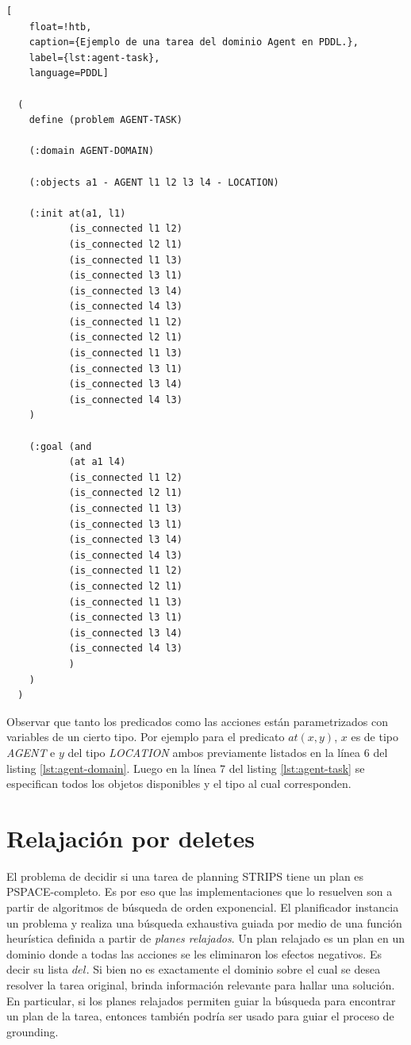 \begin{lstlisting}[
    float=!htb,
    caption={Ejemplo de una tarea del dominio Agent en PDDL.},
    label={lst:agent-task},
    language=PDDL]

  (
    define (problem AGENT-TASK)

    (:domain AGENT-DOMAIN)

    (:objects a1 - AGENT l1 l2 l3 l4 - LOCATION)

    (:init at(a1, l1)
           (is_connected l1 l2)
           (is_connected l2 l1)
           (is_connected l1 l3)
           (is_connected l3 l1)
           (is_connected l3 l4)
           (is_connected l4 l3)
           (is_connected l1 l2)
           (is_connected l2 l1)
           (is_connected l1 l3)
           (is_connected l3 l1)
           (is_connected l3 l4)
           (is_connected l4 l3)
    )
    
    (:goal (and 
           (at a1 l4)
           (is_connected l1 l2)
           (is_connected l2 l1)
           (is_connected l1 l3)
           (is_connected l3 l1)
           (is_connected l3 l4)
           (is_connected l4 l3)
           (is_connected l1 l2)
           (is_connected l2 l1)
           (is_connected l1 l3)
           (is_connected l3 l1)
           (is_connected l3 l4)
           (is_connected l4 l3)
           )
    )
  )
\end{lstlisting}

Observar que tanto los predicados como las acciones están parametrizados con
variables de un cierto tipo. Por ejemplo para el predicato $at(x, y)$, $x$ es de
tipo \emph{AGENT} e $y$ del tipo \emph{LOCATION} ambos previamente listados en
la línea 6 del listing \ref{lst:agent-domain}. Luego en la línea 7 del listing
\ref{lst:agent-task} se especifican todos los objetos disponibles y el tipo al
cual corresponden.

\section{Relajación por deletes}
\label{lit:delete_relaxed}

El problema de decidir si una tarea de planning STRIPS tiene un plan es
PSPACE-completo. Es por eso que las implementaciones que lo resuelven son a
partir de algoritmos de búsqueda de orden exponencial. El planificador instancia
un problema y realiza una búsqueda exhaustiva guiada por medio de una función
heurística definida a partir de \emph{planes relajados}. Un plan relajado es un
plan en un dominio donde a todas las acciones se les eliminaron los efectos
negativos. Es decir su lista $del$. Si bien no es exactamente el dominio sobre
el cual se desea resolver la tarea original, brinda información relevante para
hallar una solución. En particular, si los planes relajados permiten guiar la
búsqueda para encontrar un plan de la tarea, entonces también podría ser usado
para guiar el proceso de grounding.

